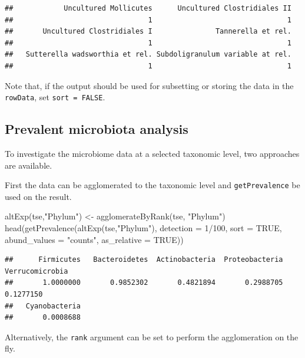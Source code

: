 \documentclass[
]{book}
\newenvironment{Shaded}{\begin{snugshade}}{\end{snugshade}}
\newcommand{\AttributeTok}[1]{\textcolor[rgb]{0.77,0.63,0.00}{#1}}
\newcommand{\ConstantTok}[1]{\textcolor[rgb]{0.00,0.00,0.00}{#1}}
\newcommand{\DecValTok}[1]{\textcolor[rgb]{0.00,0.00,0.81}{#1}}
\newcommand{\FunctionTok}[1]{\textcolor[rgb]{0.00,0.00,0.00}{#1}}
\newcommand{\NormalTok}[1]{#1}
\newcommand{\OtherTok}[1]{\textcolor[rgb]{0.56,0.35,0.01}{#1}}
\newcommand{\SpecialCharTok}[1]{\textcolor[rgb]{0.00,0.00,0.00}{#1}}
\newcommand{\StringTok}[1]{\textcolor[rgb]{0.31,0.60,0.02}{#1}}
\begin{document}
\begin{verbatim}
##            Uncultured Mollicutes      Uncultured Clostridiales II 
##                                1                                1 
##       Uncultured Clostridiales I               Tannerella et rel. 
##                                1                                1 
##   Sutterella wadsworthia et rel. Subdoligranulum variable at rel. 
##                                1                                1
\end{verbatim}

Note that, if the output should be used for subsetting or storing the data in
the \texttt{rowData}, set \texttt{sort\ =\ FALSE}.

\hypertarget{prevalent-microbiota-analysis}{%
\subsection{Prevalent microbiota analysis}\label{prevalent-microbiota-analysis}}

To investigate the microbiome data at a selected taxonomic level, two
approaches are available.

First the data can be agglomerated to the taxonomic level and \texttt{getPrevalence}
be used on the result.

\begin{Shaded}
\begin{Highlighting}[]
\FunctionTok{altExp}\NormalTok{(tse,}\StringTok{"Phylum"}\NormalTok{) }\OtherTok{\textless{}{-}} \FunctionTok{agglomerateByRank}\NormalTok{(tse, }\StringTok{"Phylum"}\NormalTok{)}
\FunctionTok{head}\NormalTok{(}\FunctionTok{getPrevalence}\NormalTok{(}\FunctionTok{altExp}\NormalTok{(tse,}\StringTok{"Phylum"}\NormalTok{), }\AttributeTok{detection =} \DecValTok{1}\SpecialCharTok{/}\DecValTok{100}\NormalTok{, }\AttributeTok{sort =} \ConstantTok{TRUE}\NormalTok{,}
                   \AttributeTok{abund\_values =} \StringTok{"counts"}\NormalTok{, }\AttributeTok{as\_relative =} \ConstantTok{TRUE}\NormalTok{))}
\end{Highlighting}
\end{Shaded}

\begin{verbatim}
##      Firmicutes   Bacteroidetes  Actinobacteria  Proteobacteria Verrucomicrobia 
##       1.0000000       0.9852302       0.4821894       0.2988705       0.1277150 
##   Cyanobacteria 
##       0.0008688
\end{verbatim}

Alternatively, the \texttt{rank} argument can be set to perform the agglomeration on
the fly.
\end{document}
